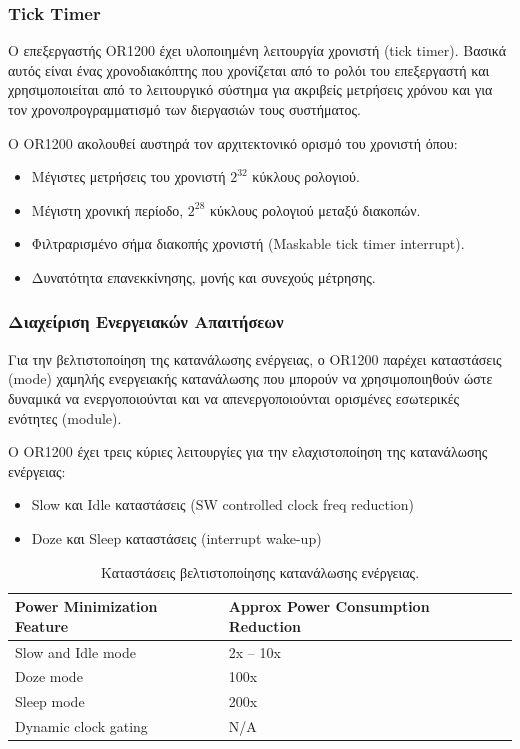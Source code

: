 \documentclass[a4paper,10pt]{article}
\numberwithin{figure}{section}
\numberwithin{table}{section}
\begin{document}
\subsubsection{Tick Timer}

O επεξεργαστής OR1200 έχει υλοποιημένη λειτουργία χρονιστή (tick timer). Βασικά αυτός είναι
ένας χρονοδιακόπτης που χρονίζεται από το ρολόι του επεξεργαστή και χρησιμοποιείται από το
λειτουργικό σύστημα για ακριβείς μετρήσεις χρόνου και για τον χρονοπρογραμματισμό των διεργασιών τους
συστήματος.
\newline

Ο OR1200 ακολουθεί αυστηρά τον αρχιτεκτονικό ορισμό του χρονιστή όπου:

\begin{itemize}
 \item Μέγιστες μετρήσεις του χρονιστή $2^{32}$ κύκλους ρολογιού.
 \item Μέγιστη χρονική περίοδο, $2^{28}$ κύκλους ρολογιού μεταξύ διακοπών.
 \item Φιλτραρισμένο σήμα διακοπής χρονιστή (Maskable tick timer interrupt).
 \item Δυνατότητα επανεκκίνησης, μονής και συνεχούς μέτρησης.
\end{itemize}


\subsubsection{Διαχείριση Ενεργειακών Απαιτήσεων}

Για την βελτιστοποίηση της κατανάλωσης ενέργειας, ο OR1200 παρέχει καταστάσεις (mode)
χαμηλής ενεργειακής κατανάλωσης που μπορούν να χρησιμοποιηθούν ώστε δυναμικά να ενεργοποιούνται
και να απενεργοποιούνται ορισμένες εσωτερικές ενότητες (module).
\newline

Ο OR1200 έχει τρεις κύριες λειτουργίες για την ελαχιστοποίηση της κατανάλωσης ενέργειας:
\begin{itemize}
 \item Slow και Idle καταστάσεις (SW controlled clock freq reduction)
 \item Doze και Sleep καταστάσεις (interrupt wake-up)
\end{itemize}

\setlength{\tabcolsep}{1em}
\begin{table}[h]
\begin{center}
\begin{tabular}{|l|l|}\hline
\rowcolor{tcA}
Power Minimization Feature & Approx Power Consumption Reduction\\\hline
Slow and Idle mode & 2x – 10x\\\hline
Doze mode & 100x\\\hline
Sleep mode & 200x\\\hline
Dynamic clock gating & N/A\\\hline
\end{tabular}
\end{center}
\caption{Καταστάσεις βελτιστοποίησης κατανάλωσης ενέργειας.}
\end{table}
\end{document}
